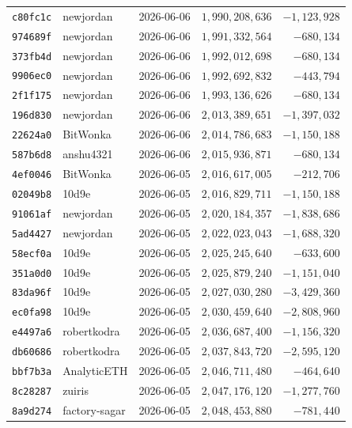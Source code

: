 {\begin{longtable}{@{}lllrr@{}}
\texttt{c80fc1c} & newjordan & 2026-06-06 & $1{,}990{,}208{,}636$ & $-1{,}123{,}928$\\
\texttt{974689f} & newjordan & 2026-06-06 & $1{,}991{,}332{,}564$ & $-680{,}134$\\
\texttt{373fb4d} & newjordan & 2026-06-06 & $1{,}992{,}012{,}698$ & $-680{,}134$\\
\texttt{9906ec0} & newjordan & 2026-06-06 & $1{,}992{,}692{,}832$ & $-443{,}794$\\
\texttt{2f1f175} & newjordan & 2026-06-06 & $1{,}993{,}136{,}626$ & $-680{,}134$\\
\texttt{196d830} & newjordan & 2026-06-06 & $2{,}013{,}389{,}651$ & $-1{,}397{,}032$\\
\texttt{22624a0} & BitWonka & 2026-06-06 & $2{,}014{,}786{,}683$ & $-1{,}150{,}188$\\
\texttt{587b6d8} & anshu4321 & 2026-06-06 & $2{,}015{,}936{,}871$ & $-680{,}134$\\
\texttt{4ef0046} & BitWonka & 2026-06-05 & $2{,}016{,}617{,}005$ & $-212{,}706$\\
\texttt{02049b8} & 10d9e & 2026-06-05 & $2{,}016{,}829{,}711$ & $-1{,}150{,}188$\\
\texttt{91061af} & newjordan & 2026-06-05 & $2{,}020{,}184{,}357$ & $-1{,}838{,}686$\\
\texttt{5ad4427} & newjordan & 2026-06-05 & $2{,}022{,}023{,}043$ & $-1{,}688{,}320$\\
\texttt{58ecf0a} & 10d9e & 2026-06-05 & $2{,}025{,}245{,}640$ & $-633{,}600$\\
\texttt{351a0d0} & 10d9e & 2026-06-05 & $2{,}025{,}879{,}240$ & $-1{,}151{,}040$\\
\texttt{83da96f} & 10d9e & 2026-06-05 & $2{,}027{,}030{,}280$ & $-3{,}429{,}360$\\
\texttt{ec0fa98} & 10d9e & 2026-06-05 & $2{,}030{,}459{,}640$ & $-2{,}808{,}960$\\
\texttt{e4497a6} & robertkodra & 2026-06-05 & $2{,}036{,}687{,}400$ & $-1{,}156{,}320$\\
\texttt{db60686} & robertkodra & 2026-06-05 & $2{,}037{,}843{,}720$ & $-2{,}595{,}120$\\
\texttt{bbf7b3a} & AnalyticETH & 2026-06-05 & $2{,}046{,}711{,}480$ & $-464{,}640$\\
\texttt{8c28287} & zuiris & 2026-06-05 & $2{,}047{,}176{,}120$ & $-1{,}277{,}760$\\
\texttt{8a9d274} & factory-sagar & 2026-06-05 & $2{,}048{,}453{,}880$ & $-781{,}440$\\

\end{longtable}}
